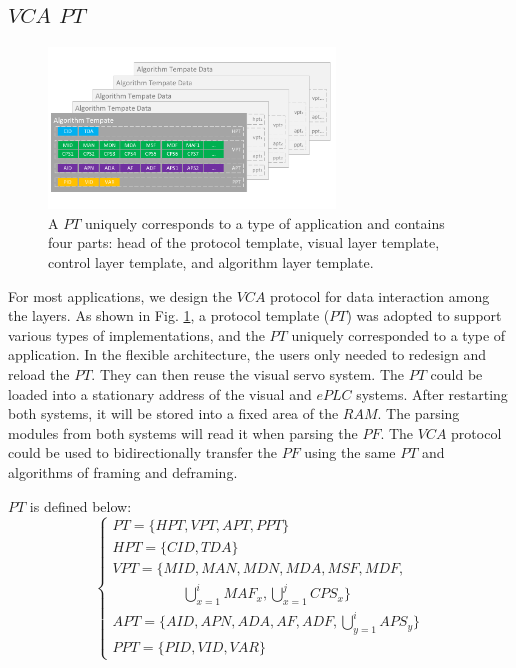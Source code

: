 \documentclass[journal,UTF8]{IEEEtran}
\begin{document}
	\subsection{$VCA$ $PT$}
	\begin{figure}
		\centering
		\includegraphics[width=3in]{fig/PT.pdf}
		\caption{A $PT$ uniquely corresponds to a type of application and contains four parts: head of the protocol template, visual layer template, control layer template, and algorithm layer template.}
		\label{fig:PT}
	\end{figure}
	For most applications, we design the $VCA$ protocol for data interaction among the layers. As shown in Fig. \ref{fig:PT}, a protocol template ($PT$) was adopted to support various types of implementations, and the $PT$ uniquely corresponded to a type of application. In the flexible architecture, the users only needed to redesign and reload the $PT$. They can then reuse the visual servo system. The $PT$ could be loaded into a stationary address of the visual and $ePLC$ systems. After restarting both systems, it will be stored into a fixed area of the $RAM$. The parsing modules from both systems will read it when parsing the $PF$. The $VCA$ protocol could be used to bidirectionally transfer the $PF$ using the same $PT$ and algorithms of framing and deframing.  
	
	$PT$ is defined below:
	\begin{equation}
	\left\{
	\begin{array}{l}
	PT = \{HPT, VPT, APT, PPT\}\\
	HPT = \{CID, TDA\}\\
	VPT = \{MID, MAN, MDN, MDA, MSF, MDF, \\
	\qquad\qquad\quad \bigcup_{x=1}^i MAF_x, \bigcup_{x=1}^j CPS_x\}\\
	APT = \{AID, APN, ADA, AF, ADF, \bigcup_{y=1}^i APS_y\}\\
	PPT = \{PID, VID, VAR\}
	\end{array}
	\right.
	\end{equation}
	
\end{document}
